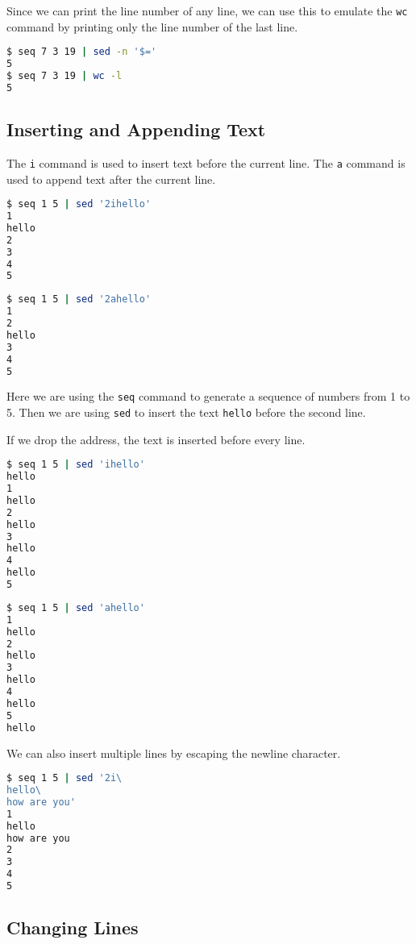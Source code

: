 Since we can print the line number of any line, we can use this to emulate the \lstinline|wc| command by printing only the line number of the last line.

\begin{lstlisting}[language=bash]
$ seq 7 3 19 | sed -n '$='
5
$ seq 7 3 19 | wc -l
5
\end{lstlisting}

\subsection{Inserting and Appending Text}

The \lstinline|i| command is used to insert text before the current line.
The \lstinline|a| command is used to append text after the current line.

\begin{lstlisting}[language=bash]
$ seq 1 5 | sed '2ihello'
1
hello
2
3
4
5
\end{lstlisting}

\begin{lstlisting}[language=bash]
$ seq 1 5 | sed '2ahello'
1
2
hello
3
4
5
\end{lstlisting}

Here we are using the \lstinline|seq| command to generate a sequence of numbers from 1 to 5.
Then we are using \lstinline|sed| to insert the text \lstinline|hello| before the second line.

If we drop the address, the text is inserted before every line.

\begin{lstlisting}[language=bash]
$ seq 1 5 | sed 'ihello'
hello
1
hello
2
hello
3
hello
4
hello
5
\end{lstlisting}

\begin{lstlisting}[language=bash]
$ seq 1 5 | sed 'ahello'
1
hello
2
hello
3
hello
4
hello
5
hello
\end{lstlisting}

We can also insert multiple lines by escaping the newline character.

\begin{lstlisting}[language=bash]
$ seq 1 5 | sed '2i\
hello\
how are you'
1
hello
how are you
2
3
4
5
\end{lstlisting}

\subsection{Changing Lines}

